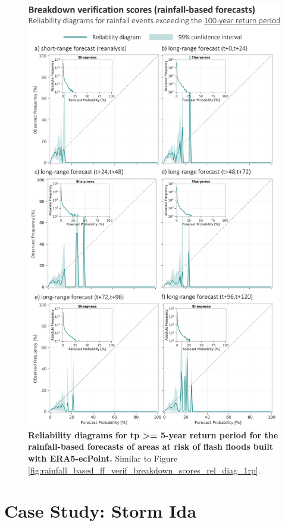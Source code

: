 \begin{figure}[htbp]
\centering
\includegraphics[width=\textwidth]{rainfall_based_ff_verif_breakdown_scores_rel_diag_100rp.png}
\caption{\textbf{Reliability diagrams for tp >= 5-year return period for the rainfall-based forecasts of areas at risk of flash floods built with ERA5-ecPoint.} Similar to Figure \ref{fig:rainfall_based_ff_verif_breakdown_scores_rel_diag_1rp}.}
\label{fig:rainfall_based_ff_verif_breakdown_scores_rel_diag_100rp}
\end{figure}


\section{Case Study: Storm Ida}
\label{flash_flood_focused_verification_rainfall_based_ff_CASE_STUDY}

